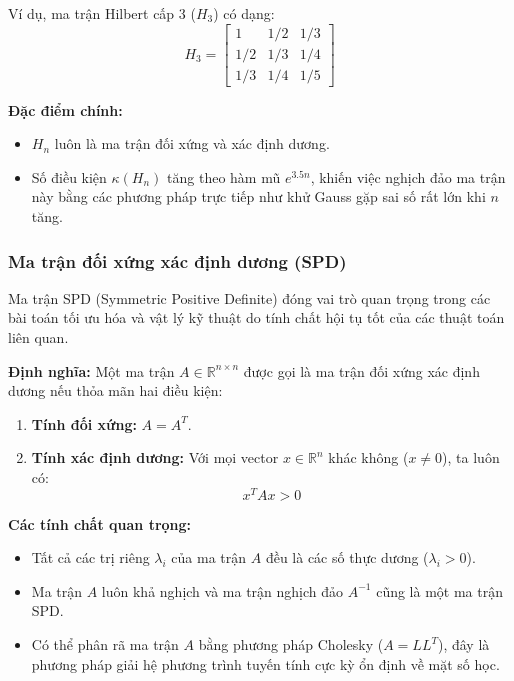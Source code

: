 \documentclass[a4paper]{article}
\begin{document}
Ví dụ, ma trận Hilbert cấp 3 ($H_3$) có dạng:
\begin{equation}
    H_3 = \begin{bmatrix} 
    1 & 1/2 & 1/3 \\ 
    1/2 & 1/3 & 1/4 \\ 
    1/3 & 1/4 & 1/5 
    \end{bmatrix}
\end{equation}

\textbf{Đặc điểm chính:}
\begin{itemize}
    \item $H_n$ luôn là ma trận đối xứng và xác định dương.
    \item Số điều kiện $\kappa(H_n)$ tăng theo hàm mũ $e^{3.5n}$, khiến việc nghịch đảo ma trận này bằng các phương pháp trực tiếp như khử Gauss gặp sai số rất lớn khi $n$ tăng.
\end{itemize}

\subsubsection{Ma trận đối xứng xác định dương (SPD)}
Ma trận SPD (Symmetric Positive Definite) đóng vai trò quan trọng trong các bài toán tối ưu hóa và vật lý kỹ thuật do tính chất hội tụ tốt của các thuật toán liên quan.

\textbf{Định nghĩa:} Một ma trận $A \in \mathbb{R}^{n \times n}$ được gọi là ma trận đối xứng xác định dương nếu thỏa mãn hai điều kiện:
\begin{enumerate}
    \item \textbf{Tính đối xứng:} $A = A^T$.
    \item \textbf{Tính xác định dương:} Với mọi vector $x \in \mathbb{R}^n$ khác không ($x \neq 0$), ta luôn có:
    \begin{equation}
        x^T Ax > 0
    \end{equation}
\end{enumerate}

\textbf{Các tính chất quan trọng:}
\begin{itemize}
    \item Tất cả các trị riêng $\lambda_i$ của ma trận $A$ đều là các số thực dương ($\lambda_i > 0$).
    \item Ma trận $A$ luôn khả nghịch và ma trận nghịch đảo $A^{-1}$ cũng là một ma trận SPD.
    \item Có thể phân rã ma trận $A$ bằng phương pháp Cholesky ($A = LL^T$), đây là phương pháp giải hệ phương trình tuyến tính cực kỳ ổn định về mặt số học.
\end{itemize}
\end{document}
